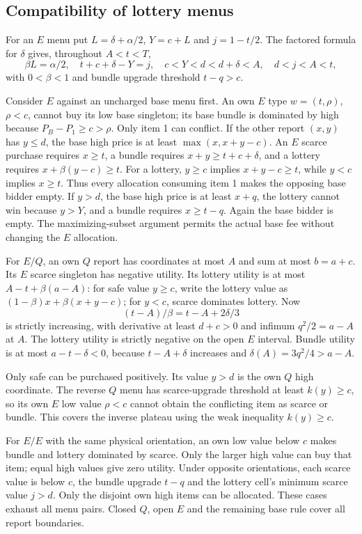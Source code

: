 \subsection{Compatibility of lottery menus}
For an $E$ menu put $L=\delta+\alpha/2$, $Y=c+L$ and $j=1-t/2$.
The factored formula for $\delta$ gives, throughout $A<t<T$,
\[
 \beta L=\alpha/2,\quad t+c+\delta-Y=j,\quad
 c<Y<d<d+\delta<A,\quad d<j<A<t,
\]
with $0<\beta<1$ and bundle upgrade threshold $t-q>c$.

Consider $E$ against an uncharged base menu first. An own $E$ type
$w=(t,\rho)$, $\rho<c$, cannot buy its low base singleton; its base
bundle is dominated by high because $P_B-P_1\ge c>\rho$. Only item 1
can conflict. If the other report $(x,y)$ has $y\le d$, the base high
price is at least $\max(x,x+y-c)$. An $E$ scarce purchase requires
$x\ge t$, a bundle requires $x+y\ge t+c+\delta$, and a lottery requires
$x+\beta(y-c)\ge t$. For a lottery, $y\ge c$ implies $x+y-c\ge t$,
while $y<c$ implies $x\ge t$. Thus every allocation consuming item 1
makes the opposing base bidder empty. If $y>d$, the base high price is
at least $x+q$, the lottery cannot win because $y>Y$, and a bundle
requires $x\ge t-q$. Again the base bidder is empty. The maximizing-subset
argument permits the actual base fee without changing the $E$ allocation.

For $E/Q$, an own $Q$ report has coordinates at most $A$ and sum at most
$b=a+c$. Its $E$ scarce singleton has negative utility. Its lottery utility
is at most $A-t+\beta(a-A)$: for safe value $y\ge c$, write the lottery
value as $(1-\beta)x+\beta(x+y-c)$; for $y<c$, scarce dominates lottery.
Now
\[
 (t-A)/\beta=t-A+2\delta/3
\]
is strictly increasing, with derivative at least $d+c>0$ and infimum
$q^2/2=a-A$ at $A$. The lottery utility is strictly negative on the open
$E$ interval. Bundle utility is at most $a-t-\delta<0$, because
$t-A+\delta$ increases and $\delta(A)=3q^2/4>a-A$.

Only safe can be purchased positively. Its value $y>d$ is the own $Q$
high coordinate. The reverse $Q$ menu has scarce-upgrade threshold at least
$k(y)\ge c$, so its own $E$ low value $\rho<c$ cannot obtain the
conflicting item as scarce or bundle. This covers the inverse plateau using
the weak inequality $k(y)\ge c$.

For $E/E$ with the same physical orientation, an own low value below $c$
makes bundle and lottery dominated by scarce. Only the larger high value
can buy that item; equal high values give zero utility. Under opposite
orientations, each scarce value is below $c$, the bundle upgrade $t-q$ and
the lottery cell's minimum scarce value $j>d$. Only the disjoint own high
items can be allocated. These cases exhaust all menu pairs. Closed $Q$,
open $E$ and the remaining base rule cover all report boundaries.


